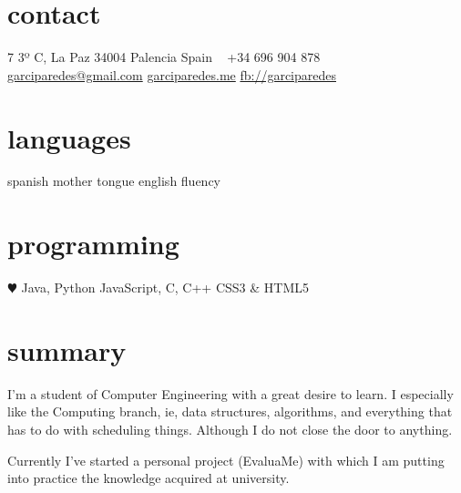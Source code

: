 \documentclass[]{friggeri-cv} %
\begin{document}


\begin{aside} %
\section{contact}
7 3º C, La Paz
34004 Palencia
Spain
~
+34 696 904 878
~
\href{mailto:garciparedes@gmail.com}{garciparedes@gmail.com}
\href{http://garciparedes.me}{garciparedes.me}
\href{http://facebook.com/garciparedes}{fb://garciparedes}
\section{languages}
spanish mother tongue
english fluency
\section{programming}
{\color{red} $\varheartsuit$}  Java, Python
JavaScript, C, C++
CSS3 \& HTML5
\end{aside}


\section{summary}



I'm a student of Computer Engineering with a great desire to learn. I especially like the Computing branch, ie, data structures, algorithms, and everything that has to do with scheduling things. Although I do not close the door to anything. 

Currently I've started a personal project (EvaluaMe) with which I am putting into practice the knowledge acquired at university.
\end{document}
